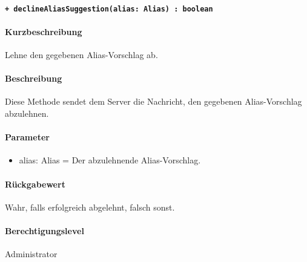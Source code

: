\paragraph{\texttt{+ declineAliasSuggestion(alias: Alias) : boolean}}\label{AP_Backend_declineAl-iasSuggestion}%
\paragraph*{Kurzbeschreibung}
Lehne den gegebenen Alias-Vorschlag ab.
\paragraph*{Beschreibung}
Diese Methode sendet dem Server die Nachricht, den gegebenen Alias-Vorschlag abzulehnen.
\paragraph*{Parameter}
\begin{itemize}
    \item alias: Alias = Der abzulehnende Alias-Vorschlag.
\end{itemize}
\paragraph*{Rückgabewert}
Wahr, falls erfolgreich abgelehnt, falsch sonst.
\paragraph*{Berechtigungslevel}
Administrator